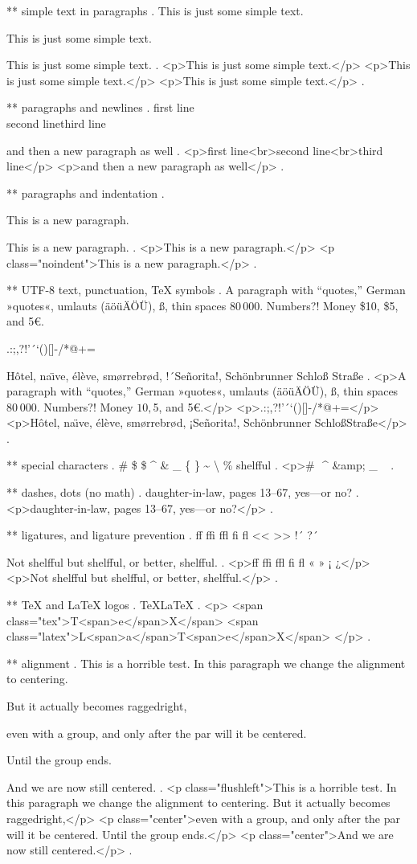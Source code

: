 ** simple text in paragraphs
.
This is just some simple text.

This is just some simple text.

This is just some simple text.
.
<p>This is just some simple text.</p>
<p>This is just some simple text.</p>
<p>This is just some simple text.</p>
.


** paragraphs and newlines
.
first line\\second line\newline third line\par and then a new paragraph as well
.
<p>ﬁrst line<br>second line<br>third line</p>
<p>and then a new paragraph as well</p>
.


** paragraphs and indentation
.
\noindent

\noindent

This is a new paragraph.

\noindent
This is a new paragraph.
.
<p>This is a new paragraph.</p>
<p class="noindent">This is a new paragraph.</p>
.


** UTF-8 text, punctuation, TeX symbols
.
A para\-graph with “quotes,” German »quotes«, umlauts (äöüÄÖÜ), ß, thin spaces 80\,000. Numbers?! Money \$10, \$5, and 5€.

.:;,?!'´`()[]-/*@+=

H\^otel, na\"\i ve, \'el\`eve, sm\o rrebr\o d, !´Se\~norita!, Sch\"onbrunner Schlo\ss{} Stra\ss e
.
<p>A para­graph with “quotes,” German »quotes«, umlauts (äöüÄÖÜ), ß, thin spaces 80 000. Numbers?! Money $10, $5, and 5€.</p>
<p>.:;,?!'´`()[]‐/*@+=</p>
<p>Hôtel, naı̈ve, élève, smørrebrød, ¡Señorita!, Schönbrunner Schloß​ Straße</p>
.


** special characters
.
\# \$ \$ \^{} \& \_ \{ \} \~{} \textbackslash{} \% shelf\-ful
.
<p># $ $ ^​ &amp; _ { } ~​ \​ %
.


** dashes, dots (no math)
.
daughter-in-law, pages 13--67, yes---or no?
.
<p>daughter‐in‐law, pages 13–67, yes—or no?</p>
.


** ligatures, and ligature prevention
.
ff ffi ffl fi fl << >> !´ ?´

Not shelfful but shelf\mbox{}ful, or better, shelf\/ful.
.
<p>ﬀ ﬃ ﬄ ﬁ ﬂ « » ¡ ¿</p>
<p>Not shelﬀul but shelfful, or better, shelf‌ful.</p>
.


** TeX and LaTeX logos
.
\TeX \LaTeX
.
<p>
<span class="tex">T<span>e</span>X</span>
<span class="latex">L<span>a</span>T<span>e</span>X</span>
</p>
.


** alignment
.
This is a horrible test.
\centering
In this paragraph we change the alignment to centering.
{\raggedright But it actually becomes raggedright,

even with a group, and only after the par will it be centered.}
Until the group ends.

And we are now still centered.
.
<p class="flushleft">This is a horrible test. In this paragraph we change the alignment to centering. But it actually becomes raggedright,</p>
<p class="center">even with a group, and only after the par will it be centered.​ Until the group ends.</p>
<p class="center">And we are now still centered.</p>
.
